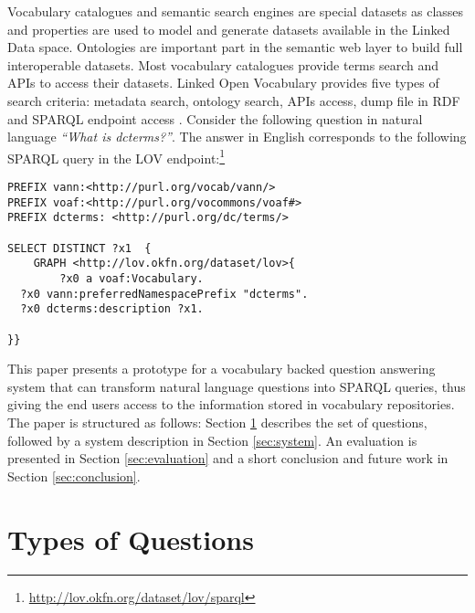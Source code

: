 \documentclass[runningheads,a4paper]{llncs}
\begin{document}
Vocabulary catalogues and semantic search engines are special datasets as classes and properties are used to model and generate datasets available in the Linked Data space. Ontologies are important part in the semantic web layer to build full interoperable datasets. Most vocabulary catalogues provide terms search and APIs to access their datasets. Linked Open Vocabulary provides five types of search criteria: metadata search, ontology search, APIs access, dump file in RDF and SPARQL endpoint access \cite{vandenbusschelov}.
Consider the following question in natural language \textit{``What is dcterms?''}. The answer in English corresponds to the following SPARQL query in the LOV endpoint:\footnote{\url{http://lov.okfn.org/dataset/lov/sparql}}

\begin{verbatim}
PREFIX vann:<http://purl.org/vocab/vann/>
PREFIX voaf:<http://purl.org/vocommons/voaf#>
PREFIX dcterms: <http://purl.org/dc/terms/>

SELECT DISTINCT ?x1  {
 	GRAPH <http://lov.okfn.org/dataset/lov>{
 	 	?x0 a voaf:Vocabulary.
  ?x0 vann:preferredNamespacePrefix "dcterms".
  ?x0 dcterms:description ?x1.
 	 
}}
\end{verbatim}


This paper presents a prototype for a vocabulary backed question answering system that can transform natural language questions into SPARQL queries, thus giving the end users access to the information stored in vocabulary repositories. The paper is structured as follows: Section \ref{sec:questions} describes the set of questions, followed by a system description in Section \ref{sec:system}. An evaluation is presented in Section \ref{sec:evaluation} and a short conclusion and future work in Section \ref{sec:conclusion}.  



\section{Types of Questions}
\label{sec:questions}
\end{document}
